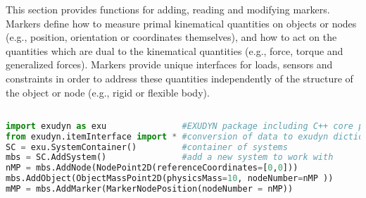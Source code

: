 This section provides functions for adding, reading and modifying markers. Markers define how to measure primal kinematical quantities on objects or nodes (e.g., position, orientation or coordinates themselves), and how to act on the quantities which are dual to the kinematical quantities (e.g., force, torque and generalized forces). Markers provide unique interfaces for loads, sensors and constraints in order to address these quantities independently of the structure of the object or node (e.g., rigid or flexible body).
\pythonstyle
\begin{lstlisting}[language=Python, firstnumber=1]

import exudyn as exu               #EXUDYN package including C++ core part
from exudyn.itemInterface import * #conversion of data to exudyn dictionaries
SC = exu.SystemContainer()         #container of systems
mbs = SC.AddSystem()               #add a new system to work with
nMP = mbs.AddNode(NodePoint2D(referenceCoordinates=[0,0]))
mbs.AddObject(ObjectMassPoint2D(physicsMass=10, nodeNumber=nMP ))
mMP = mbs.AddMarker(MarkerNodePosition(nodeNumber = nMP))
\end{lstlisting}

